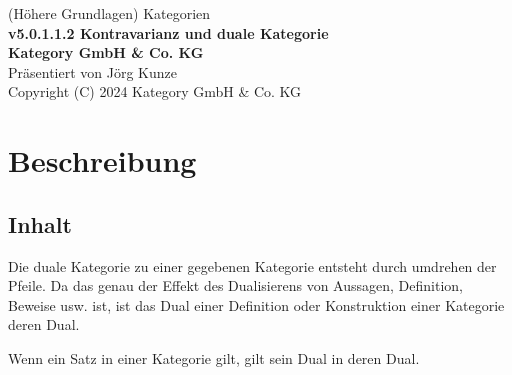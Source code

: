 \documentclass[a4paper]{amsart}
\theoremstyle{definition}
\begin{document}
\begin{titlepage}
\centering
{\huge
(Höhere Grundlagen) Kategorien\\[1cm]
\textbf{v5.0.1.1.2 Kontravarianz und duale Kategorie}
}\\[1cm]

\textbf{Kategory GmbH \& Co. KG}\\
Präsentiert von Jörg Kunze\\
Copyright (C) 2024 Kategory GmbH \& Co. KG

\end{titlepage}

%

\newpage

\section*{Beschreibung}
 
\subsection*{Inhalt}
Die duale Kategorie zu einer gegebenen Kategorie entsteht durch umdrehen der Pfeile. Da das genau der Effekt des Dualisierens von Aussagen, Definition, Beweise usw. ist, ist das Dual einer Definition oder Konstruktion einer Kategorie deren Dual.

Wenn ein Satz in einer Kategorie gilt, gilt sein Dual in deren Dual.
\end{document}

